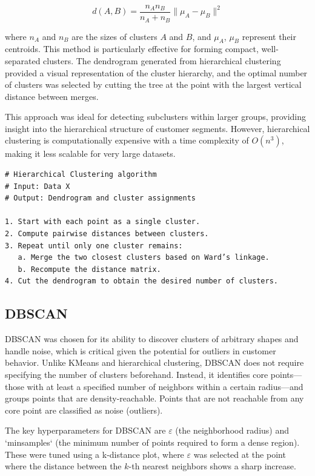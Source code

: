\documentclass[runningheads,a4paper]{llncs}
\begin{document}
\begin{equation}
d(A, B) = \frac{n_A n_B}{n_A + n_B} \| \mu_A - \mu_B \|^2
\end{equation}

where \( n_A \) and \( n_B \) are the sizes of clusters \( A \) and \( B \), and \( \mu_A \), \( \mu_B \) represent their centroids. This method is particularly effective for forming compact, well-separated clusters. The dendrogram generated from hierarchical clustering provided a visual representation of the cluster hierarchy, and the optimal number of clusters was selected by cutting the tree at the point with the largest vertical distance between merges.

This approach was ideal for detecting subclusters within larger groups, providing insight into the hierarchical structure of customer segments. However, hierarchical clustering is computationally expensive with a time complexity of \( O(n^3) \), making it less scalable for very large datasets.

\begin{verbatim}
# Hierarchical Clustering algorithm
# Input: Data X
# Output: Dendrogram and cluster assignments

1. Start with each point as a single cluster.
2. Compute pairwise distances between clusters.
3. Repeat until only one cluster remains:
   a. Merge the two closest clusters based on Ward’s linkage.
   b. Recompute the distance matrix.
4. Cut the dendrogram to obtain the desired number of clusters.
\end{verbatim}

\subsection{DBSCAN}

DBSCAN was chosen for its ability to discover clusters of arbitrary shapes and handle noise, which is critical given the potential for outliers in customer behavior. Unlike KMeans and hierarchical clustering, DBSCAN does not require specifying the number of clusters beforehand. Instead, it identifies core points—those with at least a specified number of neighbors within a certain radius—and groups points that are density-reachable. Points that are not reachable from any core point are classified as noise (outliers).

The key hyperparameters for DBSCAN are \( \varepsilon \) (the neighborhood radius) and `minsamples` (the minimum number of points required to form a dense region). These were tuned using a k-distance plot, where \( \varepsilon \) was selected at the point where the distance between the \( k \)-th nearest neighbors shows a sharp increase. 
\end{document}
